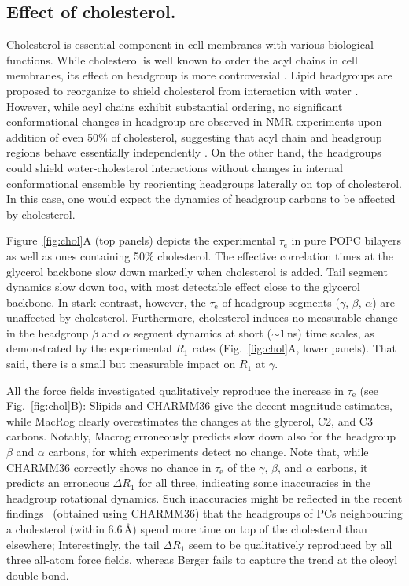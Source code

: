 \documentclass[journal=jcisd8,manuscript=article,layout=twocolumn]{achemso}
\begin{document}
\subsection*{Effect of cholesterol.}
Cholesterol is essential component in cell membranes with various biological functions.
While cholesterol is well known to order the acyl chains in cell membranes,
its effect on headgroup is more controversial \cite{huang99,ferreira13}. Lipid headgroups are proposed
to reorganize to shield cholesterol from interaction with water \cite{huang99}. However, while acyl chains exhibit substantial ordering, no
significant conformational changes in headgroup are observed in NMR experiments upon addition
of even 50\% of cholesterol,
suggesting that acyl chain and headgroup regions behave essentially independently \cite{ferreira13,botan15}.
On the other hand, the headgroups could shield water-cholesterol interactions
without changes in internal conformational ensemble by reorienting headgroups laterally on
top of cholesterol. In this case, one would expect the dynamics of headgroup carbons to be affected by cholesterol. 


Figure~\ref{fig:chol}A (top panels) depicts the experimental $\tau_\mathrm e$ in pure POPC bilayers as well as ones containing 50\% cholesterol. The effective correlation times at the glycerol backbone
slow down markedly when cholesterol is added. Tail segment dynamics slow down too, with most detectable effect close to the glycerol backbone.
%
In stark contrast, however,
the $\tau_\mathrm e$ of headgroup segments ($\gamma$, $\beta$, $\alpha$)
are unaffected by cholesterol. 
%
Furthermore, cholesterol induces no measurable change in the
headgroup $\beta$ and $\alpha$ segment
dynamics at short ($\sim$1\,ns) time scales, as
demonstrated by
the experimental $R_{1}$ rates (Fig.~\ref{fig:chol}A, lower panels).
That said,
there is a small but measurable impact on $R_1$ at $\gamma$.


All the force fields investigated qualitatively reproduce the increase in $\tau_\mathrm e$ (see Fig.~\ref{fig:chol}B):
Slipids and CHARMM36 give the decent magnitude estimates, while MacRog clearly overestimates the changes at the glycerol, C2, and C3 carbons. Notably, Macrog erroneously predicts slow down also for the headgroup $\beta$ and $\alpha$ carbons, for which experiments detect no change. 
%
Note that,  while CHARMM36 correctly shows no chance in $\tau_\mathrm{e}$
of the $\gamma$, $\beta$, and $\alpha$ carbons,
it predicts an erroneous $\Delta R_{1}$ for all three, indicating some inaccuracies in the
headgroup rotational dynamics. %
Such inaccuracies might be reflected in the recent findings~\cite{leeb18}
(obtained using CHARMM36)
that 
the headgroups of PCs neighbouring a cholesterol (within 6.6\,\AA) spend more time on top of the cholesterol than elsewhere;
%
Interestingly, 
the tail $\Delta R_{1}$ seem to be qualitatively reproduced by
all three all-atom force fields, whereas Berger fails to capture the trend at the oleoyl double bond.
\end{document}
